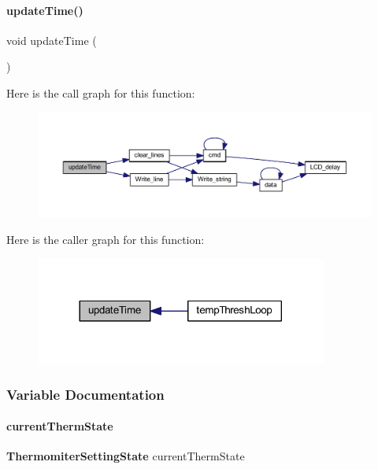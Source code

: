\paragraph{update\+Time()}
{\footnotesize\ttfamily void update\+Time (\begin{DoxyParamCaption}{ }\end{DoxyParamCaption})}

Here is the call graph for this function\+:
\nopagebreak
\begin{figure}[H]
\begin{center}
\leavevmode
\includegraphics[width=350pt]{a00053_a19562d96ecbcf8a223d3c38b39993fbf_cgraph}
\end{center}
\end{figure}
Here is the caller graph for this function\+:
\nopagebreak
\begin{figure}[H]
\begin{center}
\leavevmode
\includegraphics[width=272pt]{a00053_a19562d96ecbcf8a223d3c38b39993fbf_icgraph}
\end{center}
\end{figure}


\subsubsection{Variable Documentation}
\mbox{\label{a00053_a0b99fb402801f0cab37b25976fb424a3}} 
\paragraph{current\+Therm\+State}
{\footnotesize\ttfamily \textbf{ Thermomiter\+Setting\+State} current\+Therm\+State}

